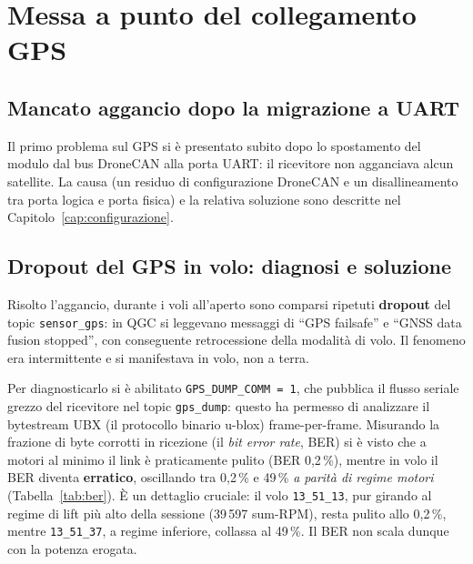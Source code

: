 \section{Messa a punto del collegamento GPS}

\subsection{Mancato aggancio dopo la migrazione a UART}

Il primo problema sul GPS si \`e presentato subito dopo lo spostamento del modulo
dal bus DroneCAN alla porta UART: il ricevitore non agganciava alcun satellite. La
causa (un residuo di configurazione DroneCAN e un disallineamento tra porta logica
e porta fisica) e la relativa soluzione sono descritte nel
Capitolo~\ref{cap:configurazione}.

\subsection{Dropout del GPS in volo: diagnosi e soluzione}

Risolto l'aggancio, durante i voli all'aperto sono comparsi ripetuti
\textbf{dropout} del topic \texttt{sensor\_gps}: in QGC si leggevano messaggi di
\enquote{GPS failsafe} e \enquote{GNSS data fusion stopped}, con conseguente
retrocessione della modalit\`a di volo. Il fenomeno era intermittente e si
manifestava in volo, non a terra.

Per diagnosticarlo si \`e abilitato \texttt{GPS\_DUMP\_COMM\,=\,1}, che pubblica il
flusso seriale grezzo del ricevitore nel topic \texttt{gps\_dump}: questo ha
permesso di analizzare il bytestream UBX (il protocollo binario u-blox)
frame-per-frame. Misurando la frazione di byte corrotti in ricezione (il
\emph{bit error rate}, BER) si \`e visto che a motori al minimo il link \`e
praticamente pulito (BER 0{,}2\,\%), mentre in volo il BER diventa
\textbf{erratico}, oscillando tra 0{,}2\,\% e 49\,\% \emph{a parit\`a di regime
motori} (Tabella~\ref{tab:ber}). \`E un dettaglio cruciale: il volo
\texttt{13\_51\_13}, pur girando al regime di lift pi\`u alto della sessione
(39\,597 sum-RPM), resta pulito allo 0{,}2\,\%, mentre \texttt{13\_51\_37}, a
regime inferiore, collassa al 49\,\%. Il BER non scala dunque con la potenza
erogata.

